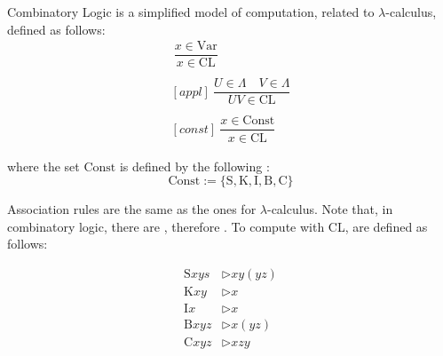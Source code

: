 \documentclass[a4paper, 12pt]{report}
\begin{document}
    
    \begin{frameddefn}{Combinatory Logic}
         is a simplified model of computation, related to $\lambda$-calculus, defined as follows:
        \begin{gather*}
            [var] \ \dfrac{x \in \mathrm{Var}}{x \in \mathrm{CL}} \\ \\
            [appl] \ \dfrac{U \in \Lambda \quad V \in \Lambda}{U V \in \mathrm{CL}} \\ \\
            [const] \ \dfrac{x \in \mathrm{Const}}{x \in \mathrm{CL}}
        \end{gather*}

        where the set $\mathrm{Const}$ is defined by the following : $$\mathrm{Const} := \{\mathrm S, \mathrm K, \mathrm I, \mathrm B, \mathrm C\}$$
    \end{frameddefn}

    Association rules are the same as the ones for $\lambda$-calculus. Note that, in combinatory logic, there are , therefore . To compute with CL,  are defined as follows:

    \begin{equation*}
        \begin{split}
            \mathrm S xys &\triangleright xy(yz) \\
            \mathrm K xy &\triangleright x \\
            \mathrm I x &\triangleright x \\
            \mathrm B xyz &\triangleright x(yz) \\
            \mathrm C xyz &\triangleright xzy
        \end{split}
    \end{equation*}
\end{document}
